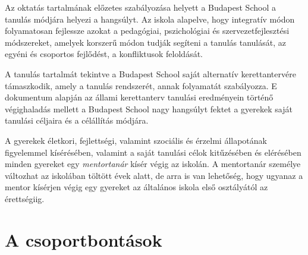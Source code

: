 
Az oktatás tartalmának előzetes szabályozása helyett a Budapest School a
tanulás módjára helyezi a hangsúlyt. Az iskola alapelve,
hogy
integratív módon folyamatosan fejlessze azokat a pedagógiai, pszichológiai és
szervezetfejlesztési módszereket,
amelyek korszerű módon tudják segíteni a tanulás tanulását, az egyéni és
csoportos fejlődést, a konfliktusok feloldását.

A tanulás tartalmát tekintve a Budapest School saját alternatív
kerettantervére támaszkodik, amely a tanulás rendszerét, annak
folyamatát szabályozza. E dokumentum alapján az állami kerettanterv
tanulási eredményein történő végighaladás mellett a Budapest School
nagy hangsúlyt fektet a gyerekek saját tanulási céljaira és a
célállítás módjára.

A gyerekek életkori, fejlettségi, valamint szociális és érzelmi
állapotának figyelemmel kísérésében, valamint a saját tanulási célok
kitűzésében és elérésében minden gyereket egy \emph{mentortanár} kísér végig
az iskolán. A mentortanár személye változhat
az iskolában töltött évek
alatt, de arra is van lehetőség, hogy ugyanaz a mentor kísérjen végig
egy gyereket az általános iskola első osztályától az érettségiig.




\section{A csoportbontások}
\label{sec:csoportbontasok}

